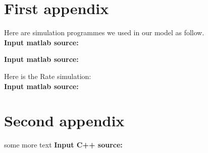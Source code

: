 \documentclass{mcmthesis}
\begin{document}
\begin{appendices}

\section{First appendix}

Here are simulation programmes we used in our model as follow.\\

\textbf{\textcolor[rgb]{0.98,0.00,0.00}{Input matlab source:}}


\textbf{\textcolor[rgb]{0.98,0.00,0.00}{Input matlab source:}}


Here is the Rate simulation:\\

\textbf{\textcolor[rgb]{0.98,0.00,0.00}{Input matlab source:}}






\section{Second appendix}

some more text \textcolor[rgb]{0.00,0.90,0.00}{\textbf{Input C++ source:}}


\end{appendices}
\end{document}
